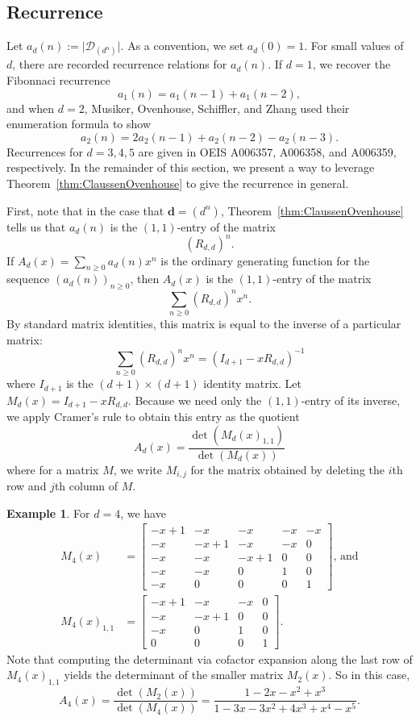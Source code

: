 \documentclass{amsart}
\def\bfd{{\mathbf{d}}}
\theoremstyle{definition}
\newtheorem{example}[theorem]{Example}
\begin{document}
\subsection{Recurrence}


Let $a_d(n) := \vert  
\mathcal{D}_{(d^n)}
\vert$. As a convention, we set $a_d(0) = 1$. For small values of $d$, there are recorded recurrence relations for $a_d(n)$. If $d = 1$, we recover the Fibonnaci recurrence \[
a_1(n) = a_1(n-1) + a_1(n-2),
\]
and when $d = 2$, Musiker, Ovenhouse, Schiffler, and Zhang \cite{zbMATH08171225} used their enumeration formula to show \[
a_2(n) = 2a_2(n-1) + a_2(n-2) - a_2(n-3).
\]
Recurrences for $d=3,4,5$ are given in OEIS  A006357, A006358, and A006359, respectively. 
In the remainder of this section, we present a way to leverage Theorem~\ref{thm:ClaussenOvenhouse} to give the recurrence in general.


First, note that in the case that $\bfd=(d^n)$, Theorem~\ref{thm:ClaussenOvenhouse} tells us that
$a_d(n)$ is the $(1,1)$-entry of the matrix
\[\left(R_{d,d}\right)^n.\]
If $A_d(x)=\sum_{n\geq0}a_d(n)x^n$ is the ordinary generating function for the sequence
$(a_d(n))_{n\geq0}$, then $A_d(x)$ is the $(1,1)$-entry of the matrix
\[\sum_{n\geq0}\left(R_{d,d}\right)^nx^n.\]
By standard matrix identities, this matrix is equal to the inverse of a particular matrix:
\[\sum_{n\geq0}\left(R_{d,d}\right)^nx^n=(I_{d+1}-xR_{d,d})^{-1}\] where $I_{d+1}$ is the
$(d+1)\times(d+1)$ identity matrix.
Let $M_d(x)=I_{d+1}-xR_{d,d}$.
Because we need only the $(1,1)$-entry of its inverse, we apply Cramer's rule to obtain this entry as
the quotient
\[A_d(x)=\frac{\det\left(M_d(x)_{1,1}\right)}{\det\left(M_d(x)\right)}\]
where for a matrix $M$, we write $M_{i,j}$ for the matrix obtained by deleting
the $i$th row and $j$th column of $M$.

\begin{example}
    For $d=4$, we have
    \begin{align*}
        M_4(x)&=\left[\begin{array}{rrrrr}
-x + 1 & -x & -x & -x & -x \\
-x & -x + 1 & -x & -x & 0 \\
-x & -x & -x + 1 & 0 & 0 \\
-x & -x & 0 & 1 & 0 \\
-x & 0 & 0 & 0 & 1
\end{array}\right]\text{, and}\\
M_4(x)_{1,1}&=\left[\begin{array}{rrrr}
-x + 1 & -x & -x & 0 \\
-x & -x + 1 & 0 & 0 \\
-x & 0 & 1 & 0 \\
 0 & 0 & 0 & 1
\end{array}\right].
    \end{align*}
    Note that computing the determinant via cofactor expansion
    along the last row of $M_4(x)_{1,1}$ yields the determinant
    of the smaller matrix $M_2(x)$. So in this case,
    \[A_4(x)=\frac{\det(M_2(x))}{\det(M_4(x))}=\frac{1-2x-x^2+x^3}{1-3x-3x^2+4x^3+x^4-x^5}.\]
\end{example}
\end{document}
